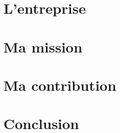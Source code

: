 \documentclass[12pt]{report}
\begin{document}
	

	
	
	\tableofcontents
	
	\part{L'entreprise}
		
		
	\part{Ma mission}
		
		
	\part{Ma contribution}
		
		
	\part*{Conclusion}
		
\end{document}
